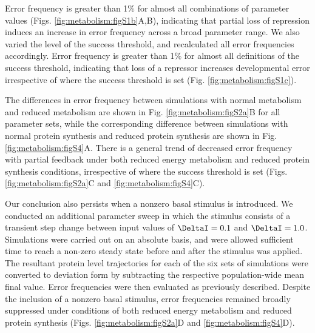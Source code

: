 Error frequency is greater than 1\% for almost all combinations of parameter values (Figs. \ref{fig:metabolism:figS1b}A,B), indicating that partial loss of repression induces an increase in error frequency across a broad parameter range. We also varied the level of the success threshold, and recalculated all error frequencies accordingly. Error frequency is greater than 1\% for almost all definitions of the success threshold, indicating that loss of a repressor increases developmental error irrespective of where the success threshold is set (Fig. \ref{fig:metabolism:figS1c}).

The differences in error frequency between simulations with normal metabolism and reduced metabolism are shown in Fig. \ref{fig:metabolism:figS2a}B for all parameter sets, while the corresponding difference between simulations with normal protein synthesis and reduced protein synthesis are shown in Fig. \ref{fig:metabolism:figS4}A. There is a general trend of decreased error frequency with partial feedback under both reduced energy metabolism and reduced protein synthesis conditions, irrespective of where the success threshold is set (Figs. \ref{fig:metabolism:figS2a}C and \ref{fig:metabolism:figS4}C).

Our conclusion also persists when a nonzero basal stimulus is introduced. We conducted an additional parameter sweep in which the stimulus consists of a transient step change between input values of $\DeltaI=0.1$ and $\DeltaI=1.0$. Simulations were carried out on an absolute basis, and were allowed sufficient time to reach a non-zero steady state before and after the stimulus was applied. The resultant protein level trajectories for each of the six sets of simulations were converted to deviation form by subtracting the respective population-wide mean final value. Error frequencies were then evaluated as previously described. Despite the inclusion of a nonzero basal stimulus, error frequencies remained broadly suppressed under conditions of both reduced energy metabolism and reduced protein synthesis (Figs. \ref{fig:metabolism:figS2a}D and \ref{fig:metabolism:figS4}D).


